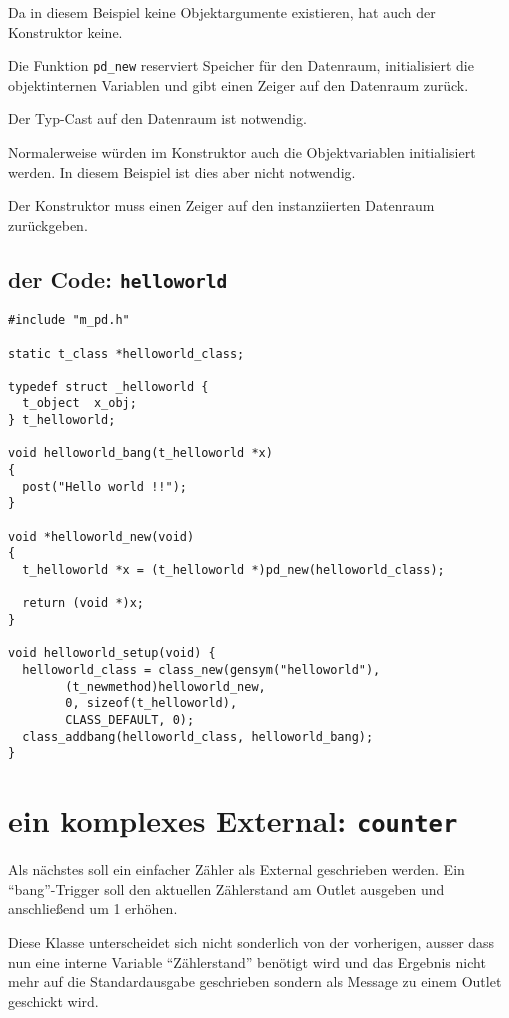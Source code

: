 \documentclass[12pt, a4paper,austrian, titlepage]{article}
\begin{document}
Da in diesem Beispiel keine Objektargumente existieren, hat auch
der Konstruktor keine.

Die Funktion \verb+pd_new+ reserviert Speicher für den Datenraum, initialisiert
die objektinternen Variablen und gibt einen Zeiger auf den Datenraum zurück.

Der Typ-Cast auf den Datenraum ist notwendig.

Normalerweise würden im Konstruktor auch die Objektvariablen initialisiert werden.
In diesem Beispiel ist dies aber nicht notwendig.

Der Konstruktor muss einen Zeiger auf den instanziierten Datenraum zurückgeben.

\subsection{der Code: \tt helloworld}

\begin{verbatim}
#include "m_pd.h"

static t_class *helloworld_class;

typedef struct _helloworld {
  t_object  x_obj;
} t_helloworld;

void helloworld_bang(t_helloworld *x)
{
  post("Hello world !!");
}

void *helloworld_new(void)
{
  t_helloworld *x = (t_helloworld *)pd_new(helloworld_class);

  return (void *)x;
}

void helloworld_setup(void) {
  helloworld_class = class_new(gensym("helloworld"),
        (t_newmethod)helloworld_new,
        0, sizeof(t_helloworld),
        CLASS_DEFAULT, 0);
  class_addbang(helloworld_class, helloworld_bang);
}
\end{verbatim}


\section{ein komplexes External: {\tt counter}}

Als nächstes soll ein einfacher Zähler als External geschrieben werden.
Ein ``bang''-Trigger soll den aktuellen Zählerstand am Outlet ausgeben
und anschließend um 1 erhöhen.

Diese Klasse unterscheidet sich nicht sonderlich von der vorherigen, 
ausser dass nun eine interne Variable ``Zählerstand'' benötigt
wird und das Ergebnis nicht mehr auf die Standardausgabe geschrieben sondern
als Message zu einem Outlet geschickt wird.
\end{document}
